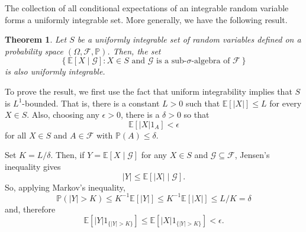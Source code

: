 \documentclass[12pt]{article}
\newtheorem*{theorem*}{Theorem}
\begin{document}

The collection of all conditional expectations of an integrable random variable forms a uniformly integrable set. More generally, we have the following result.


\begin{theorem*}
Let $S$ be a uniformly integrable set of random variables defined on a probability space $(\Omega,\mathcal{F},\mathbb{P})$. Then, the set
\begin{equation*}
\left\{\mathbb{E}[X\mid\mathcal{G}]:\textrm{$X\in S$ and $\mathcal{G}$ is a sub-$\sigma$-algebra of $\mathcal{F}$}\right\}
\end{equation*}
is also uniformly integrable.
\end{theorem*}

To prove the result, we first use the fact that uniform integrability implies that $S$ is $L^1$-bounded. That is, there is a constant $L>0$ such that $\mathbb{E}[|X|]\le L$ for every $X\in S$.
Also, choosing any $\epsilon>0$, there is a $\delta>0$ so that
\begin{equation*}
\mathbb{E}[|X|1_A]<\epsilon
\end{equation*}
for all $X\in S$ and $A\in\mathcal{F}$ with $\mathbb{P}(A)\le\delta$.

Set $K=L/\delta$. Then, if $Y=\mathbb{E}[X\mid\mathcal{G}]$ for any $X\in S$ and $\mathcal{G}\subseteq\mathcal{F}$, Jensen's inequality gives
\begin{equation*}
|Y|\le\mathbb{E}[|X|\mid\mathcal{G}].
\end{equation*}
So, applying Markov's inequality,
\begin{equation*}
\mathbb{P}(|Y|>K)\le K^{-1}\mathbb{E}[|Y|]\le K^{-1}\mathbb{E}[|X|]\le L/K=\delta
\end{equation*}
and, therefore
\begin{equation*}
\mathbb{E}[|Y|1_{\{|Y|>K\}}]\le \mathbb{E}[|X|1_{\{|Y|>K\}}]<\epsilon.
\end{equation*}

\end{document}
